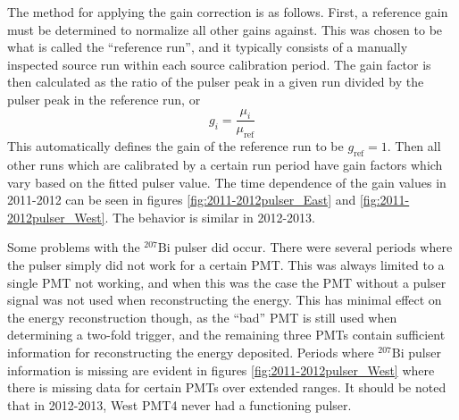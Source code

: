 The method for applying the gain correction is as follows. First, a reference gain must be determined
to normalize all other gains against. This was chosen to be what is called the ``reference run'', and it
typically consists of a manually inspected source run within each source calibration period. The gain factor
is then calculated as the ratio of the pulser peak in a given run divided by the pulser peak in the reference
run, or
%
\begin{equation}
  g_i = \frac{\mu_i}{\mu_{\mathrm{ref}}}
\end{equation}
%
This automatically defines the gain of the reference run to be $g_{\mathrm{ref}}=1$. Then all other runs which are
calibrated by a certain run period have gain factors which vary based on the fitted pulser value. The time
dependence of the gain values in 2011-2012 can be seen in figures \ref{fig:2011-2012pulser_East}
and \ref{fig:2011-2012pulser_West}. The behavior is similar in 2012-2013.

Some problems with the $^{207}\mathrm{Bi}$ pulser did occur. There were several periods where the pulser
simply did not work for a certain PMT. This was always limited to a single PMT not working, and when this
was the case the PMT without a pulser signal was not used when reconstructing the energy. This has
minimal effect on the energy reconstruction though, as the ``bad'' PMT is still used when determining
a two-fold trigger, and the remaining three PMTs contain sufficient information for reconstructing the
energy deposited. Periods where $^{207}\mathrm{Bi}$ pulser information is missing are evident in
figures \ref{fig:2011-2012pulser_West} where there is missing data for certain PMTs over extended ranges.
It should be noted that in 2012-2013, West PMT4 never had a functioning pulser.

